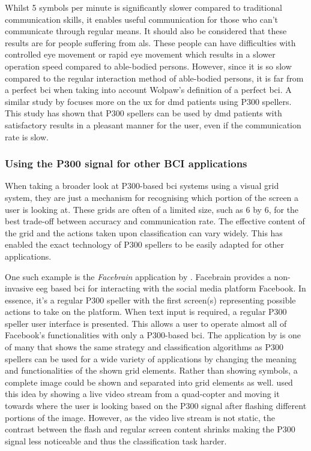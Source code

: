Whilst 5 symbols per minute is significantly slower compared to traditional communication skills, it enables useful communication for those who can't communicate through regular means.
It should also be considered that these results are for people suffering from \gls{als}.
These people can have difficulties with controlled eye movement or rapid eye movement which results in a slower operation speed compared to able-bodied persons.
However, since it is so slow compared to the regular interaction method of able-bodied persons, it is far from a perfect \gls{bci} when taking into account Wolpaw's definition of a perfect \gls{bci}.
A similar study by \citet{p300_speller_real_life2} focuses more on the \gls{ux} for \gls{dmd} patients using P300 spellers.
This study has shown that P300 spellers can be used by \gls{dmd} patients with satisfactory results in a pleasant manner for the user, even if the communication rate is slow.


\subsubsection{Using the P300 signal for other BCI applications}
\label{subsubsec:bci_common_use_cases_bcis_replace_eye_tracking_p300_other_applications}

When taking a broader look at P300-based \gls{bci} systems using a visual grid system, they are just a mechanism for recognising which portion of the screen a user is looking at.
These grids are often of a limited size, such as 6 by 6, for the best trade-off between accuracy and communication rate.
The effective content of the grid and the actions taken upon classification can vary widely.
This has enabled the exact technology of P300 spellers to be easily adapted for other applications.

One such example is the \textit{Facebrain} application by \citet{facebrain}.
Facebrain provides a non-invasive \gls{eeg} based \gls{bci} for interacting with the social media platform Facebook.
In essence, it's a regular P300 speller with the first screen(s) representing possible actions to take on the platform.
When text input is required, a regular P300 speller user interface is presented.
This allows a user to operate almost all of Facebook's functionalities with only a P300-based \gls{bci}.
The application by \citet{facebrain} is one of many that shows the same strategy and classification algorithms as P300 spellers can be used for a wide variety of applications by changing the meaning and functionalities of the shown grid elements.
Rather than showing symbols, a complete image could be shown and separated into grid elements as well.
 used this idea by showing a live video stream from a quad-copter and moving it towards where the user is looking based on the P300 signal after flashing different portions of the image.
However, as the video live stream is not static, the contrast between the flash and regular screen content shrinks making the P300 signal less noticeable and thus the classification task harder.

